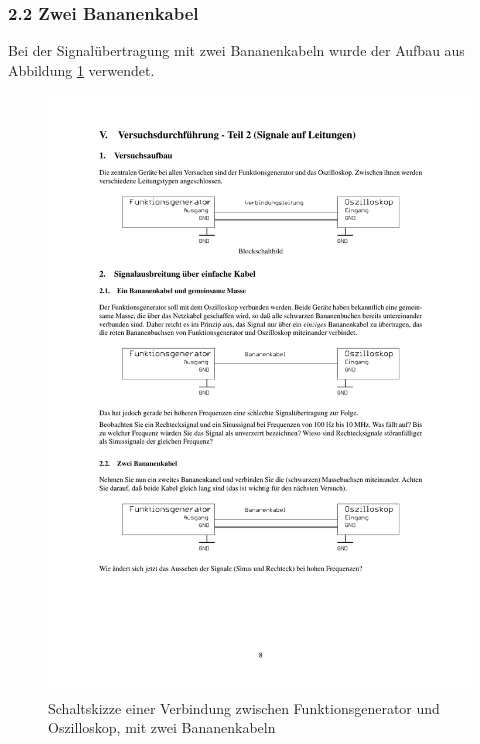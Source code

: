 \documentclass[12pt,a4paper]{article}
\begin{document}
\subsubsection{2.2 Zwei Bananenkabel}

Bei der Signalübertragung mit zwei Bananenkabeln wurde der Aufbau aus Abbildung \ref{fig:2.2} verwendet.

\begin{figure}[H] 
  \centering
    \includegraphics[trim = 10mm 70mm 10mm 200mm, clip, scale = 1]{2_0-2_2.pdf}
  	\caption[Schaltskizze einer Verbindung zwischen Funktionsgenerator und Oszilloskop, mit zwei Bananenkabeln]{Schaltskizze einer Verbindung zwischen Funktionsgenerator und Oszilloskop, mit zwei Bananenkabeln\footnotemark}
  \label{fig:2.2}
\end{figure}
\end{document}
